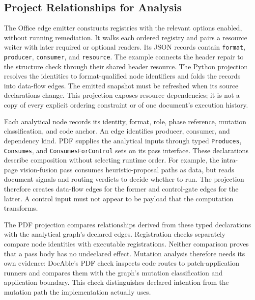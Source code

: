 \subsection*{Project Relationships for Analysis}

The Office edge emitter constructs registries with the relevant options enabled, without running remediation. It walks each ordered registry and pairs a resource writer with later required or optional readers. Its JSON records contain \texttt{format}, \texttt{producer}, \texttt{consumer}, and \texttt{resource}. The example connects the header repair to the structure check through their shared header resource. The Python projection resolves the identities to format-qualified node identifiers and folds the records into data-flow edges. The emitted snapshot must be refreshed when its source declarations change. This projection exposes resource dependencies; it is not a copy of every explicit ordering constraint or of one document's execution history.

Each analytical node records its identity, format, role, phase reference, mutation classification, and code anchor. An edge identifies producer, consumer, and dependency kind. PDF supplies the analytical inputs through typed \texttt{Produces}, \texttt{Consumes}, and \texttt{ConsumesForControl} sets on its pass interface. These declarations describe composition without selecting runtime order. For example, the intra-page vision-fusion pass consumes heuristic-proposal paths as data, but reads document signals and routing verdicts to decide whether to run. The projection therefore creates data-flow edges for the former and control-gate edges for the latter. A control input must not appear to be payload that the computation transforms.

The PDF projection compares relationships derived from these typed declarations with the analytical graph's declared edges. Registration checks separately compare node identities with executable registrations. Neither comparison proves that a pass body has no undeclared effect. Mutation analysis therefore needs its own evidence: DocAble's PDF check inspects code routes to patch-application runners and compares them with the graph's mutation classification and application boundary. This check distinguishes declared intention from the mutation path the implementation actually uses.

